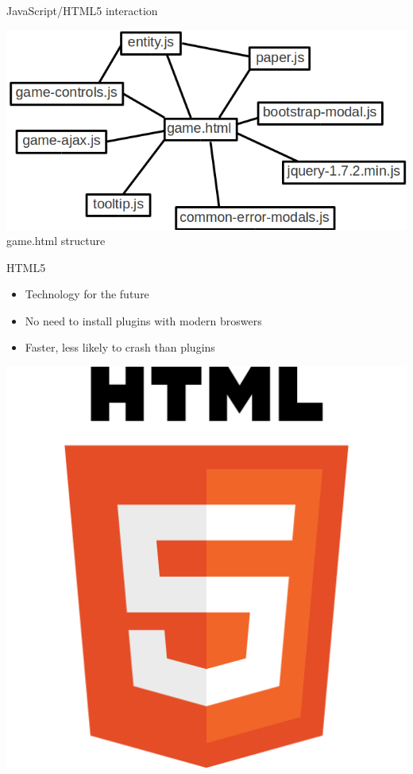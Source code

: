 \documentclass{beamer}
\begin{document}
\begin{frame}{JavaScript/HTML5 interaction}
  \begin{center}
    \includegraphics[scale=0.4]{game_html_structure.png} \\
    game.html structure
  \end{center}
\end{frame}

\begin{frame}{HTML5}
  \begin{itemize}
    \item Technology for the future
    \vspace{\baselineskip}
    \item No need to install plugins with modern broswers
    \vspace{\baselineskip}
    \item Faster, less likely to crash than plugins
  \end{itemize}
  \vspace{\baselineskip}
  \begin{center}
    \includegraphics[scale=0.1]{HTML5_Logo_512.png}
  \end{center}
\end{frame}
\end{document}
